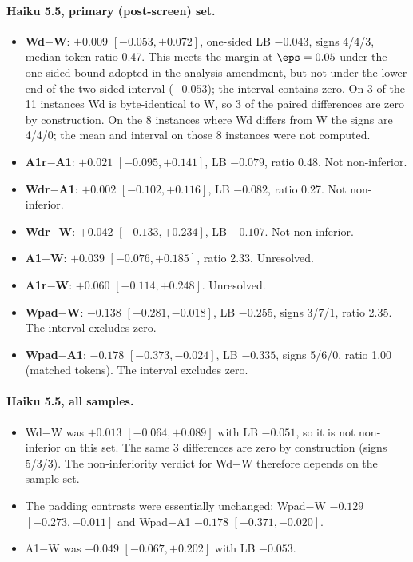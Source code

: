 \paragraph{Haiku 5.5, primary (post-screen) set.}
\begin{itemize}
\item \textbf{Wd$-$W}: $+0.009$ $[-0.053, +0.072]$, one-sided LB $-0.043$, signs 4/4/3, median token ratio 0.47. This meets the margin at $\eps = 0.05$ under the one-sided bound adopted in the analysis amendment, but not under the lower end of the two-sided interval ($-0.053$); the interval contains zero. On 3 of the 11 instances Wd is byte-identical to W, so 3 of the paired differences are zero by construction. On the 8 instances where Wd differs from W the signs are 4/4/0; the mean and interval on those 8 instances were not computed.
\item \textbf{A1r$-$A1}: $+0.021$ $[-0.095, +0.141]$, LB $-0.079$, ratio 0.48. Not non-inferior.
\item \textbf{Wdr$-$A1}: $+0.002$ $[-0.102, +0.116]$, LB $-0.082$, ratio 0.27. Not non-inferior.
\item \textbf{Wdr$-$W}: $+0.042$ $[-0.133, +0.234]$, LB $-0.107$. Not non-inferior.
\item \textbf{A1$-$W}: $+0.039$ $[-0.076, +0.185]$, ratio 2.33. Unresolved.
\item \textbf{A1r$-$W}: $+0.060$ $[-0.114, +0.248]$. Unresolved.
\item \textbf{Wpad$-$W}: $-0.138$ $[-0.281, -0.018]$, LB $-0.255$, signs 3/7/1, ratio 2.35. The interval excludes zero.
\item \textbf{Wpad$-$A1}: $-0.178$ $[-0.373, -0.024]$, LB $-0.335$, signs 5/6/0, ratio 1.00 (matched tokens). The interval excludes zero.
\end{itemize}

\paragraph{Haiku 5.5, all samples.}
\begin{itemize}
\item Wd$-$W was $+0.013$ $[-0.064, +0.089]$ with LB $-0.051$, so it is not non-inferior on this set. The same 3 differences are zero by construction (signs 5/3/3). The non-inferiority verdict for Wd$-$W therefore depends on the sample set.
\item The padding contrasts were essentially unchanged: Wpad$-$W $-0.129$ $[-0.273, -0.011]$ and Wpad$-$A1 $-0.178$ $[-0.371, -0.020]$.
\item A1$-$W was $+0.049$ $[-0.067, +0.202]$ with LB $-0.053$.
\end{itemize}

